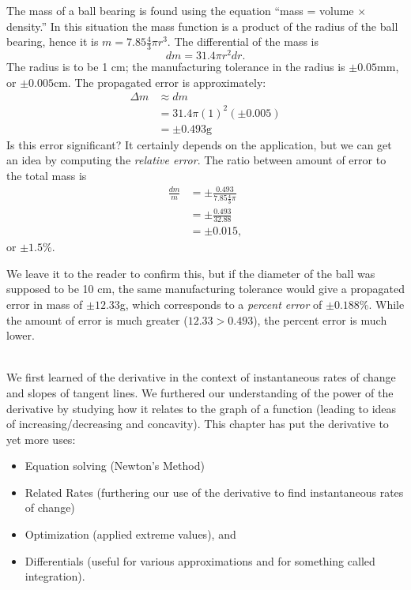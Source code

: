 {The mass of a ball bearing is found using the equation ``mass = volume $\times$ density.'' In this situation the mass function is a product of the radius of the ball bearing, hence it is $m = 7.85\frac43\pi r^3$. The differential of the mass is 
\[
dm = 31.4\pi r^2 dr.
\]
 The radius is to be 1 cm; the manufacturing tolerance in the radius is $\pm 0.05$mm, or $\pm 0.005$cm. The propagated error is approximately:
\begin{align*}
\Delta m & \approx dm \\
				&= 31.4\pi (1)^2 (\pm 0.005) \\
				&= \pm 0.493\text{g}
\end{align*}
Is this error significant? It certainly depends on the application, but we can get an idea by computing the \textit{relative error}. The ratio between amount of error to the total mass is
\begin{align*}
\frac{dm}{m} &= \pm \frac{0.493}{7.85\frac43\pi} \\
							&=\pm \frac{0.493}{32.88}\\
							&=\pm 0.015,
\end{align*}
or $\pm 1.5$\%. 

\enlargethispage{\baselineskip}

We leave it to the reader to confirm this, but if the diameter of the ball was supposed to be 10 cm, the same manufacturing tolerance would give a propagated error in mass of $\pm12.33$g, which corresponds to a \textit{percent error} of $\pm0.188$\%. While the amount of error is much greater ($12.33 > 0.493$), the percent error is much lower.
}\\

We first learned of the derivative in the context of instantaneous rates of change and slopes of tangent lines. We furthered our understanding of the power of the derivative by studying how it relates to the graph of a function (leading to ideas of increasing/decreasing and concavity). This chapter has put the derivative to yet more uses:
\begin{itemize}
\item Equation solving (Newton's Method)
\item	Related Rates (furthering our use of the derivative to find instantaneous rates of change)
\item	Optimization (applied extreme values), and
\item	Differentials (useful for various approximations and for something called integration).
\end{itemize}

